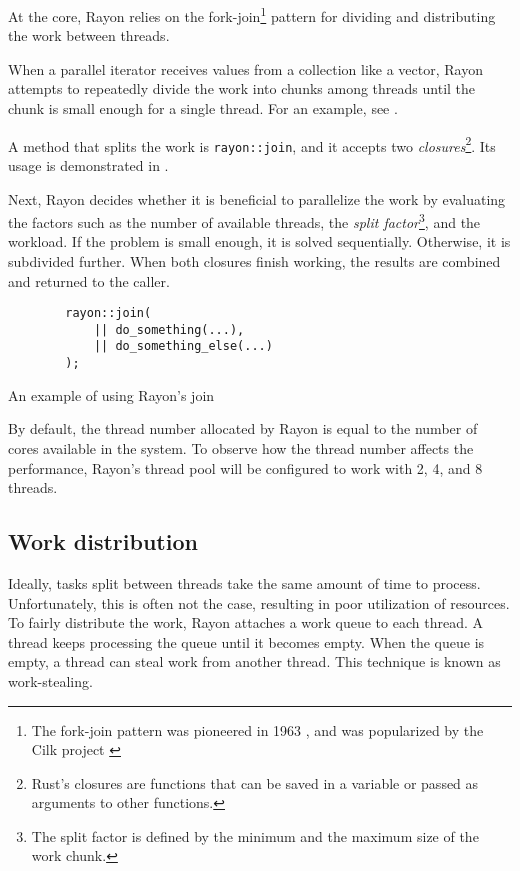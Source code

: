 At the core, Rayon relies on the fork-join\footnote{The fork-join pattern was pioneered in 1963 \cite{history-of-fork-join}, and was popularized by the Cilk project \cite{cilk}} pattern for dividing and distributing the work between threads.

When a parallel iterator receives values from a collection like a vector, Rayon attempts to repeatedly divide the work into chunks among threads until the chunk is small enough for a single thread. For an example, see .

A method that splits the work is \texttt{rayon::join}, and it accepts two \emph{closures}\footnote{Rust’s closures are functions that can be saved in a variable or passed as arguments to other functions.}. Its usage is demonstrated in .

Next, Rayon decides whether it is beneficial to parallelize the work by evaluating the factors such as the number of available threads, the \emph{split factor}\footnote{The split factor is defined by the minimum and the maximum size of the work chunk.}, and the workload. If the problem is small enough, it is solved sequentially. Otherwise, it is subdivided further. When both closures finish working, the results are combined and returned to the caller.

\begin{listing}[!htbp]

    \centering
    \begin{verbatim}
        rayon::join(
            || do_something(...),
            || do_something_else(...)
        );
    \end{verbatim}

    \caption{An example of using Rayon's join}
    \label{lst:rayon-join}
\end{listing}

By default, the thread number allocated by Rayon is equal to the number of cores available in the system. To observe how the thread number affects the performance, Rayon's thread pool will be configured to work with 2, 4, and 8 threads.

\subsection{Work distribution}
Ideally, tasks split between threads take the same amount of time to process. Unfortunately, this is often not the case, resulting in poor utilization of resources. To fairly distribute the work, Rayon attaches a work queue to each thread. A thread keeps processing the queue until it becomes empty. When the queue is empty, a thread can steal work from another thread. This technique is known as work-stealing.

